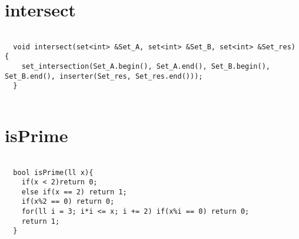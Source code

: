 \documentclass{jsarticle}
\begin{document}
\color{white}
\section{intersect}
\color{black}
\begin{lstlisting}[caption=intersect]

  void intersect(set<int> &Set_A, set<int> &Set_B, set<int> &Set_res) {
    set_intersection(Set_A.begin(), Set_A.end(), Set_B.begin(), Set_B.end(), inserter(Set_res, Set_res.end()));
  }
  

\end{lstlisting}

\color{white}
\section{isPrime}
\color{black}
\begin{lstlisting}[caption=isPrime]

  bool isPrime(ll x){
    if(x < 2)return 0;
    else if(x == 2) return 1;
    if(x%2 == 0) return 0;
    for(ll i = 3; i*i <= x; i += 2) if(x%i == 0) return 0;
    return 1;
  }
  

\end{lstlisting}

\color{white}
\end{document}
